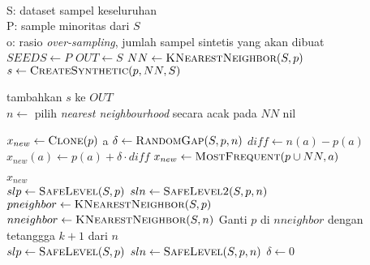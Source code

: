 \begin{center}
	\label{alg:lnsmote}
	\begin{algorithmic}[1]
\Require \\
S: dataset sampel keseluruhan \\
P: sample minoritas dari $ S $ \\
o: rasio \textit{over-sampling}, jumlah sampel sintetis yang akan dibuat \\

	\State $ SEEDS \gets P $
	\State $ OUT \gets S $
		\State $ NN \gets \Call{KNearestNeighbor}{S, p} $
			\State $ s \gets \Call{CreateSynthetic}{p, NN, S} $

				\State tambahkan $ s $ ke $OUT$
			\EndIf
		\EndFor
	\EndFor
	\State {}
\EndFunction
\\
	\State $ n \gets $ pilih \textit{nearest neighbourhood} secara acak
	pada $ NN $
		\State \Return nil
	\EndIf

	\State $ x_{new} \gets \Call{Clone}{p} $
	a
			\State $ \delta \gets \Call{RandomGap}{S, p, n} $
			\State $ diff \gets n(a) - p(a) $
			\State $ x_{new}(a) \gets p(a) + \delta \cdot diff $
		\Else
			\State $ x_{new} \gets \Call{MostFrequent}{p \cup NN, a} $
		\EndIf
	\EndFor

	\State \Return $ x_{new} $
\EndFunction
\\
	\State $ slp \gets \Call{SafeLevel}{S, p} $
	\State $ sln \gets \Call{SafeLevel2}{S, p, n} $
	\State {}
\EndFunction
\\
	\State $ pneighbor \gets \Call{KNearestNeighbor}{S, p} $
	\State {}
\EndFunction
\\
	\State $ nneighbor \gets \Call{KNearestNeighbor}{ S, n } $
		\State Ganti $ p $ di $ nneighbor $ dengan tetanggga $ k + 1 $
		dari $ n $
	\EndIf
	\State {}
\EndFunction
\\
	\State $ slp \gets \Call{SafeLevel}{S, p} $
	\State $ sln \gets \Call{SafeLevel}{S, p, n} $
	\State $ \delta \gets 0 $


\end{algorithmic}
\end{center}
